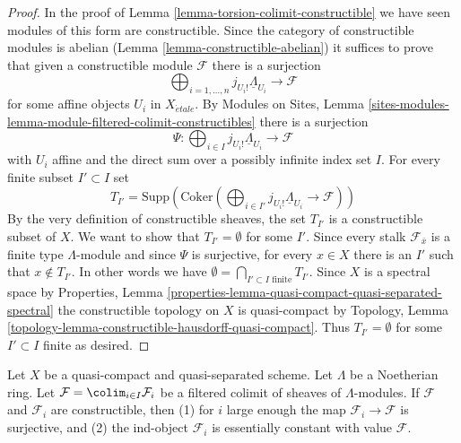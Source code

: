 \begin{proof}
In the proof of Lemma \ref{lemma-torsion-colimit-constructible}
we have seen modules of this form are constructible. Since the
category of constructible modules is abelian
(Lemma \ref{lemma-constructible-abelian})
it suffices to prove that given a constructible module $\mathcal{F}$
there is a surjection
$$
\bigoplus\nolimits_{i = 1, \ldots, n} j_{U_i!}\underline{\Lambda}_{U_i}
\longrightarrow \mathcal{F}
$$
for some affine objects $U_i$ in $X_{\acute{e}tale}$. By
Modules on Sites, Lemma
\ref{sites-modules-lemma-module-filtered-colimit-constructibles}
there is a surjection
$$
\Psi :
\bigoplus\nolimits_{i \in I} j_{U_i!}\underline{\Lambda}_{U_i}
\longrightarrow
\mathcal{F}
$$
with $U_i$ affine and the direct sum over a possibly infinite
index set $I$. For every finite subset $I' \subset I$ set
$$
T_{I'} = \text{Supp}(\text{Coker}(
\bigoplus\nolimits_{i \in I'} j_{U_i!}\underline{\Lambda}_{U_i}
\longrightarrow \mathcal{F}))
$$
By the very definition of constructible sheaves, the set $T_{I'}$
is a constructible subset of $X$. We want to show that $T_{I'} = \emptyset$
for some $I'$. Since every stalk $\mathcal{F}_{\overline{x}}$ is
a finite type $\Lambda$-module and since $\Psi$ is surjective, for
every $x \in X$ there is an $I'$ such that $x \not \in T_{I'}$.
In other words we have
$\emptyset = \bigcap_{I' \subset I\text{ finite}} T_{I'}$. Since
$X$ is a spectral space by Properties, Lemma
\ref{properties-lemma-quasi-compact-quasi-separated-spectral}
the constructible topology on $X$ is quasi-compact by
Topology, Lemma \ref{topology-lemma-constructible-hausdorff-quasi-compact}.
Thus $T_{I'} = \emptyset$ for some $I' \subset I$ finite
as desired.
\end{proof}

\begin{lemma}
\label{lemma-colimit-constructible}
Let $X$ be a quasi-compact and quasi-separated scheme.
Let $\Lambda$ be a Noetherian ring.
Let $\mathcal{F} = \colim_{i \in I} \mathcal{F}_i$ be a filtered colimit of
sheaves of $\Lambda$-modules. If $\mathcal{F}$ and $\mathcal{F}_i$
are constructible, then (1) for $i$ large enough the map
$\mathcal{F}_i \to \mathcal{F}$ is surjective, and (2) the ind-object
$\mathcal{F}_i$ is essentially constant with value $\mathcal{F}$.
\end{lemma}

